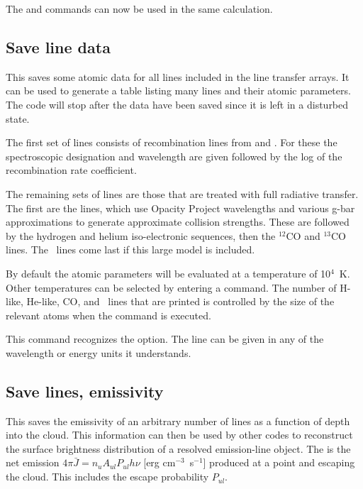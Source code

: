 The  and  commands can now be used in the same calculation.

\subsection{Save line data}
\label{sec:SaveLineData}


This saves some atomic data for all lines included in the line transfer
arrays.  It can be used to generate a table listing many lines and their
atomic parameters.
The code will stop after the data have been saved since
it is left in a disturbed state.

The first set of lines consists of recombination lines from \citet{Nussbaumer1984} and \citet{Pequignot1991}.  For these
the spectroscopic designation and wavelength are given followed by the log
of the recombination rate coefficient.

The remaining sets of lines are those that are treated with full radiative
transfer.
The first are the  lines, which use Opacity Project
wavelengths and various g-bar approximations to generate approximate
collision strengths.   These are followed by the
hydrogen and helium iso-electronic sequences, then the $^{12}$CO and $^{13}$CO lines.
The \htwo\ lines come last if this large model is included.

By default the atomic parameters will be evaluated at a temperature of
10$^4$~K.  Other temperatures can be selected by entering a
 command.
The number of H-like, He-like, CO,
and \htwo\ lines that are printed is controlled by the size of the
relevant atoms when the  command is executed.

This command recognizes the  option.
The line
can be given in any of the wavelength or energy units
it understands.

\subsection{Save lines, emissivity}

This saves the emissivity of an arbitrary number of lines as a function
of depth into the cloud.  This information can then be used by other codes
to reconstruct the surface brightness distribution of a resolved
emission-line object.  The 
is the net emission
$4\pi \bar J = n_u A_{ul} P_{ul} h\nu $
[erg cm$^{-3}$~s$^{-1}$] produced at a point and escaping the cloud.
This includes the escape probability $P_{ul}$.

